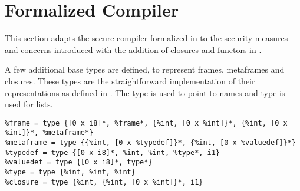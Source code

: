 \section{Formalized Compiler}
\label{sec:formalizedcompiler2}
This section adapts the secure compiler formalized in  to the security measures and concerns introduced with the addition of closures and functors in .

A few additional base types are defined, to represent frames, metaframes and closures. These types are the straightforward implementation of their representations as defined in .
The type \lsttext{[0 x i8]*} is used to point to names and type  is used for lists.
\begin{lstlisting}
%frame = type {[0 x i8]*, %frame*, {%int, [0 x %int]}*, {%int, [0 x %int]}*, %metaframe*}
%metaframe = type {{%int, [0 x %typedef]}*, {%int, [0 x %valuedef]}*}
%typedef = type {[0 x i8]*, %int, %int, %type*, i1}
%valuedef = type {[0 x i8]*, type*}
%type = type {%int, %int, %int}
%closure = type {%int, {%int, [0 x %int]}*, i1}
\end{lstlisting}

